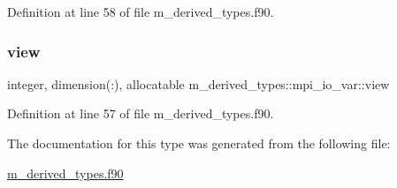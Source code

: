 Definition at line 58 of file m\+\_\+derived\+\_\+types.\+f90.

\mbox{\label{structm__derived__types_1_1mpi__io__var_a19194d57a71bab3f81f1bb6c05743fed}} 
\subsubsection{\texorpdfstring{view}{view}}
{\footnotesize\ttfamily integer, dimension(\+:), allocatable m\+\_\+derived\+\_\+types\+::mpi\+\_\+io\+\_\+var\+::view}



Definition at line 57 of file m\+\_\+derived\+\_\+types.\+f90.



The documentation for this type was generated from the following file\+:\begin{DoxyCompactItemize}
\item 
\hyperlink{m__derived__types_8f90}{m\+\_\+derived\+\_\+types.\+f90}\end{DoxyCompactItemize}
